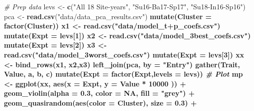 \documentclass[
]{article}
\newenvironment{Shaded}{\begin{snugshade}}{\end{snugshade}}
\newcommand{\CommentTok}[1]{\textcolor[rgb]{0.56,0.35,0.01}{\textit{#1}}}
\newcommand{\DataTypeTok}[1]{\textcolor[rgb]{0.13,0.29,0.53}{#1}}
\newcommand{\DecValTok}[1]{\textcolor[rgb]{0.00,0.00,0.81}{#1}}
\newcommand{\FloatTok}[1]{\textcolor[rgb]{0.00,0.00,0.81}{#1}}
\newcommand{\KeywordTok}[1]{\textcolor[rgb]{0.13,0.29,0.53}{\textbf{#1}}}
\newcommand{\NormalTok}[1]{#1}
\newcommand{\OperatorTok}[1]{\textcolor[rgb]{0.81,0.36,0.00}{\textbf{#1}}}
\newcommand{\OtherTok}[1]{\textcolor[rgb]{0.56,0.35,0.01}{#1}}
\newcommand{\StringTok}[1]{\textcolor[rgb]{0.31,0.60,0.02}{#1}}
\begin{document}
\begin{Shaded}
\begin{Highlighting}[]
\CommentTok{# Prep data}
\NormalTok{levs <-}\StringTok{ }\KeywordTok{c}\NormalTok{(}\StringTok{"All 18 Site-years"}\NormalTok{, }\StringTok{"Su16-Ba17-Sp17"}\NormalTok{, }\StringTok{"Su18-In16-Sp16"}\NormalTok{)}
\NormalTok{pca <-}\StringTok{ }\KeywordTok{read.csv}\NormalTok{(}\StringTok{"data/data_pca_results.csv"}\NormalTok{) }\OperatorTok{%
\StringTok{  }\KeywordTok{mutate}\NormalTok{(}\DataTypeTok{Cluster =} \KeywordTok{factor}\NormalTok{(Cluster))}
\NormalTok{x1 <-}\StringTok{ }\KeywordTok{read.csv}\NormalTok{(}\StringTok{"data/model_t+p_coefs.csv"}\NormalTok{) }\OperatorTok{%
\StringTok{  }\KeywordTok{mutate}\NormalTok{(}\DataTypeTok{Expt =}\NormalTok{ levs[}\DecValTok{1}\NormalTok{]) }\OperatorTok{%
\NormalTok{x2 <-}\StringTok{ }\KeywordTok{read.csv}\NormalTok{(}\StringTok{"data/model_3best_coefs.csv"}\NormalTok{) }\OperatorTok{%
\StringTok{  }\KeywordTok{mutate}\NormalTok{(}\DataTypeTok{Expt =}\NormalTok{ levs[}\DecValTok{2}\NormalTok{])}
\NormalTok{x3 <-}\StringTok{ }\KeywordTok{read.csv}\NormalTok{(}\StringTok{"data/model_3worst_coefs.csv"}\NormalTok{) }\OperatorTok{%
\StringTok{  }\KeywordTok{mutate}\NormalTok{(}\DataTypeTok{Expt =}\NormalTok{ levs[}\DecValTok{3}\NormalTok{])}
\NormalTok{xx <-}\StringTok{ }\KeywordTok{bind_rows}\NormalTok{(x1, x2,x3) }\OperatorTok{%
\StringTok{  }\KeywordTok{left_join}\NormalTok{(pca, }\DataTypeTok{by =} \StringTok{"Entry"}\NormalTok{) }\OperatorTok{%
\StringTok{  }\KeywordTok{gather}\NormalTok{(Trait, Value, a, b, c) }\OperatorTok{%
\StringTok{  }\KeywordTok{mutate}\NormalTok{(}\DataTypeTok{Expt =} \KeywordTok{factor}\NormalTok{(Expt,}\DataTypeTok{levels =}\NormalTok{ levs))}
\CommentTok{# Plot}
\NormalTok{mp <-}\StringTok{ }\KeywordTok{ggplot}\NormalTok{(xx, }\KeywordTok{aes}\NormalTok{(}\DataTypeTok{x =}\NormalTok{ Expt, }\DataTypeTok{y =}\NormalTok{ Value }\OperatorTok{*}\StringTok{ }\DecValTok{10000}\NormalTok{ )) }\OperatorTok{+}
\StringTok{  }\KeywordTok{geom_violin}\NormalTok{(}\DataTypeTok{alpha =} \FloatTok{0.3}\NormalTok{, }\DataTypeTok{color =} \OtherTok{NA}\NormalTok{, }\DataTypeTok{fill =} \StringTok{"grey"}\NormalTok{) }\OperatorTok{+}\StringTok{ }
\StringTok{  }\KeywordTok{geom_quasirandom}\NormalTok{(}\KeywordTok{aes}\NormalTok{(}\DataTypeTok{color =}\NormalTok{ Cluster), }\DataTypeTok{size =} \FloatTok{0.3}\NormalTok{) }\OperatorTok{+}\StringTok{ }
}}}}}}}}
\end{Highlighting}
\end{Shaded}
\end{document}

